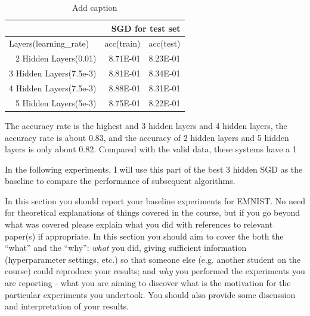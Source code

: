 \documentclass{article}
\begin{document}
\begin{table}[htbp]
  \centering
  \caption{Add caption}
    \begin{tabular}{|r|r|r|}
    \toprule
    \multicolumn{3}{|p{23.75em}}{SGD for test set} \\
    \midrule
    \multicolumn{1}{|l|}{\multirow{2}[2]{*}{Layers(learning\_rate)}} & \multicolumn{1}{r|}{\multirow{2}[2]{*}{acc\newline{}(train)}} & \multicolumn{1}{r|}{\multirow{2}[2]{*}{acc\newline{}(test)}} \\
    \multicolumn{1}{|l|}{} &       &  \\
    \midrule
    \multicolumn{1}{|r|}{\multirow{2}[2]{*}{2 Hidden Layers(0.01)}} & \multirow{2}[2]{*}{8.71E-01} & \multirow{2}[2]{*}{8.23E-01} \\
          &       &  \\
    \midrule
    \multicolumn{1}{|r|}{\multirow{2}[2]{*}{3 Hidden Layers(7.5e-3)}} & \multirow{2}[2]{*}{8.81E-01} & \multirow{2}[2]{*}{8.34E-01} \\
          &       &  \\
    \midrule
    \multicolumn{1}{|r|}{\multirow{2}[2]{*}{4 Hidden Layers(7.5e-3)}} & \multirow{2}[2]{*}{8.88E-01} & \multirow{2}[2]{*}{8.31E-01} \\
          &       &  \\
    \midrule
    \multicolumn{1}{|r|}{\multirow{2}[2]{*}{5 Hidden Layers(5e-3)}} & \multirow{2}[2]{*}{8.75E-01} & \multirow{2}[2]{*}{8.22E-01} \\
          &       &  \\
    \bottomrule
    \end{tabular}%
  \label{tab:addlabel}%
\end{table}%

The accuracy rate is the highest and 3 hidden layers and 4 hidden layers, the accuracy rate is about 0.83, and the accuracy of 2 hidden layers and 5 hidden layers is only about 0.82. Compared with the valid data, these systems have a 1%

In the following experiments, I will use this part of the best 3 hidden SGD as the baseline to compare the performance of subsequent algorithms.


In this section you should report your baseline experiments for EMNIST.  No need for theoretical explanations of things covered in the course, but if you go beyond what was covered please explain what you did with references to relevant paper(s) if appropriate.   In this section you should aim to cover the both the ``what'' and the ``why'': \emph{what} you did, giving sufficient information (hyperparameter settings, etc.) so that someone else (e.g. another student on the course) could reproduce your results; and \emph{why} you performed the experiments you are reporting - what you are aiming to discover what is the motivation for the particular experiments you undertook. You should also provide some discussion and interpretation of your results.  
\end{document}
